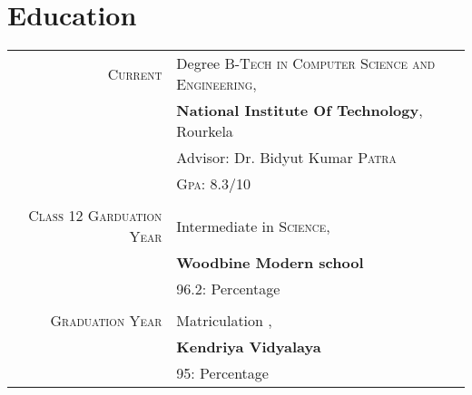 \documentclass[a4paper,10pt]{article}
\begin{document}
\section{Education}
    \begin{tabular}{rl}	
         \textsc{Current} & Degree \textsc{B-Tech in Computer Science and Engineering},\\ & \textbf{National Institute Of Technology}, Rourkela\\
        & \small Advisor: Dr. Bidyut Kumar \textsc{Patra}\\
        &\normalsize \textsc{Gpa}: 8.3/10 \\ \\
        \textsc{Class 12 Garduation Year} & Intermediate in \textsc{Science},\\ & \textbf{Woodbine Modern school}\\
        &\normalsize \textsc{96.2}: Percentage
        \\ \\
        \textsc{Graduation Year} & Matriculation ,\\ & \textbf{Kendriya Vidyalaya}\\
        &\normalsize \textsc{95}: Percentage
    \end{tabular}

\end{document}
